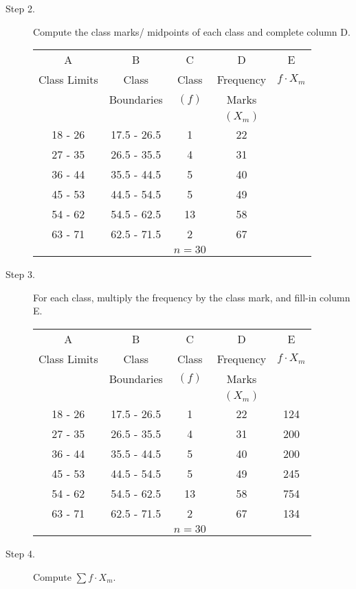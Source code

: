 \begin{example}
\begin{myenumerate}
\begin{description}
\item[Step 2.] Compute the class marks/ midpoints of each class and complete column D.

\begin{center}
\begin{tabular}{ccccc}
\hline \hline
A & B & C & D & E\\
Class Limits & Class & Class & Frequency & $f\cdot X_m$\\
 & Boundaries & $(f)$ & Marks & \\
 &  &  & $(X_m)$ & \\
\hline
18 - 26 & 17.5 - 26.5 & 1  & 22 & \\
27 - 35 & 26.5 - 35.5 & 4  & 31 & \\ 
36 - 44 & 35.5 - 44.5 & 5  & 40 & \\
45 - 53 & 44.5 - 54.5 & 5  & 49 & \\
54 - 62 & 54.5 - 62.5 & 13 & 58 & \\
63 - 71 & 62.5 - 71.5 & 2  & 67 & \\
\hline
 & & $n=30$ & & \\
\end{tabular}
\end{center}

\item[Step 3.] For each class, multiply the frequency by the class mark, and fill-in
column E.

\begin{center}
\begin{tabular}{ccccc}
\hline \hline
A & B & C & D & E\\
Class Limits & Class & Class & Frequency & $f\cdot X_m$\\
 & Boundaries & $(f)$ & Marks & \\
 &  &  & $(X_m)$ & \\
\hline
18 - 26 & 17.5 - 26.5 & 1  & 22 & 124 \\
27 - 35 & 26.5 - 35.5 & 4  & 31 & 200 \\ 
36 - 44 & 35.5 - 44.5 & 5  & 40 & 200 \\
45 - 53 & 44.5 - 54.5 & 5  & 49 & 245 \\
54 - 62 & 54.5 - 62.5 & 13 & 58 & 754 \\
63 - 71 & 62.5 - 71.5 & 2  & 67 & 134 \\
\hline
 & & $n=30$ & & \\
\end{tabular}
\end{center}

\item[Step 4.] Compute $\sum f\cdot X_m$.


\end{description}
\end{myenumerate}
\end{example}
